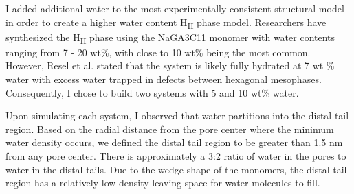 \documentclass{article}
\begin{document}
  I added additional water to the most experimentally consistent structural
  model in order to create a higher water content H\textsubscript{II} phase
  model. Researchers have synthesized the H\textsubscript{II} phase using 
  the NaGA3C11 monomer with water contents ranging from 7 - 20 wt\%, with 
  close to 10 wt\% being the most common.~\cite{smith_ordered_1997,zhou_supported_2005} 
  However, Resel et al. stated that the system is likely fully hydrated at
  7 wt \% water with excess water trapped in defects between hexagonal
  mesophases.~\cite{resel_structural_2000} Consequently, I chose to build
  two systems with 5 and 10 wt\% water.
  
  Upon simulating each system, I observed that water partitions into the
  distal tail region. Based on the radial distance from the pore center where 
  the minimum water density occurs, we defined the distal tail region to 
  be greater than 1.5 nm from any pore center. There is approximately a 3:2
  ratio of water in the pores to water in the distal tails. Due to the wedge
  shape of the monomers, the distal tail region has a relatively low density
  leaving space for water molecules to fill.
  
\end{document}
